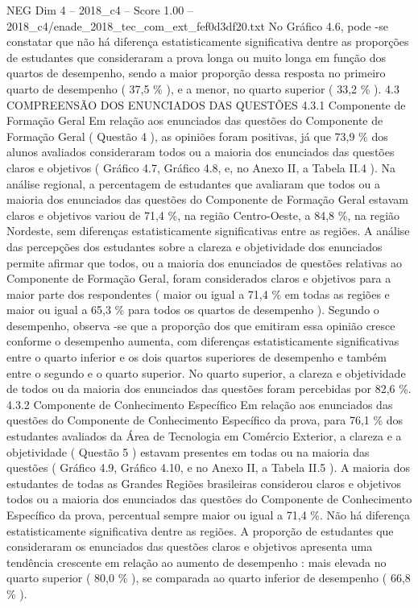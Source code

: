 \begin{textsample}{NEG Dim 4 – 2018\_c4 – Score 1.00 – 2018\_c4/enade\_2018\_tec\_com\_ext\_fef0d3df20.txt}
No Gráfico 4.6, pode -se constatar que não há diferença estatisticamente significativa dentre as proporções de estudantes que consideraram a prova longa ou muito longa em função dos quartos de desempenho, sendo a maior proporção dessa resposta no primeiro quarto de desempenho ( 37,5 \% ), e a menor, no quarto superior ( 33,2 \% ). 4.3 COMPREENSÃO DOS ENUNCIADOS DAS QUESTÕES 4.3.1 Componente de Formação Geral Em relação aos enunciados das questões do Componente de Formação Geral ( Questão 4 ), as opiniões foram positivas, já que 73,9 \% dos alunos avaliados consideraram todos ou a maioria dos enunciados das questões claros e objetivos ( Gráfico 4.7, Gráfico 4.8, e, no Anexo II, a Tabela II.4 ).
Na análise regional, a percentagem de estudantes que avaliaram que todos ou a maioria dos enunciados das questões do Componente de Formação Geral estavam claros e objetivos variou de 71,4 \%, na região Centro-Oeste, a 84,8 \%, na região Nordeste, sem diferenças estatisticamente significativas entre as regiões.
A análise das percepções dos estudantes sobre a clareza e objetividade dos enunciados permite afirmar que todos, ou a maioria dos enunciados de questões relativas ao Componente de Formação Geral, foram considerados claros e objetivos para a maior parte dos respondentes ( maior ou igual a 71,4 \% em todas as regiões e maior ou igual a 65,3 \% para todos os quartos de desempenho ).
Segundo o desempenho, observa -se que a proporção dos que emitiram essa opinião cresce conforme o desempenho aumenta, com diferenças estatisticamente significativas entre o quarto inferior e os dois quartos superiores de desempenho e também entre o segundo e o quarto superior.
No quarto superior, a clareza e objetividade de todos ou da maioria dos enunciados das questões foram percebidas por 82,6 \%. 4.3.2 Componente de Conhecimento Específico Em relação aos enunciados das questões do Componente de Conhecimento Específico da prova, para 76,1 \% dos estudantes avaliados da Área de Tecnologia em Comércio Exterior, a clareza e a objetividade ( Questão 5 ) estavam presentes em todas ou na maioria das questões ( Gráfico 4.9, Gráfico 4.10, e no Anexo II, a Tabela II.5 ).
A maioria dos estudantes de todas as Grandes Regiões brasileiras considerou claros e objetivos todos ou a maioria dos enunciados das questões do Componente de Conhecimento Específico da prova, percentual sempre maior ou igual a 71,4 \%.
Não há diferença estatisticamente significativa dentre as regiões.
A proporção de estudantes que consideraram os enunciados das questões claros e objetivos apresenta uma tendência crescente em relação ao aumento de desempenho : mais elevada no quarto superior ( 80,0 \% ), se comparada ao quarto inferior de desempenho ( 66,8 \% ).

\end{textsample}
